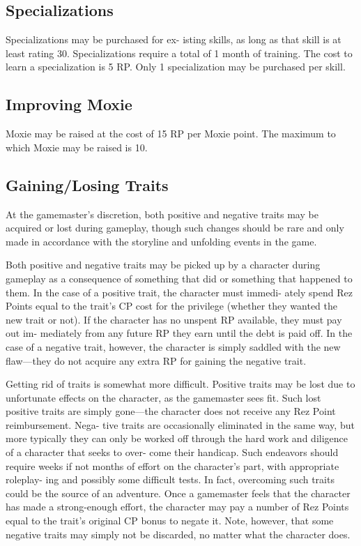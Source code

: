 \subsection{Specializations}

Specializations may be purchased for ex-
isting skills, as long as that skill is at least 
rating 30. Specializations require a total 
of 1 month of training. The cost to learn a 
specialization is 5 RP. Only 1 specialization 
may be purchased per skill.

\subsection{Improving Moxie}

Moxie may be raised at the cost of 15 RP per 
Moxie point. The maximum to which Moxie 
may be raised is 10.

\subsection{Gaining/Losing Traits}

At the gamemaster's discretion, both positive 
and negative traits may be acquired or lost 
during gameplay, though such changes should 
be rare and only made in accordance with the 
storyline and unfolding events in the game.

Both positive and negative traits may be 
picked up by a character during gameplay 
as a consequence of something that did or 
something that happened to them. In the case 
of a positive trait, the character must immedi-
ately spend Rez Points equal to the trait's CP 
cost for the privilege (whether they wanted 
the new trait or not). If the character has no 
unspent RP available, they must pay out im-
mediately from any future RP they earn until 
the debt is paid off. In the case of a negative 
trait, however, the character is simply saddled 
with the new flaw—they do not acquire any 
extra RP for gaining the negative trait.

Getting rid of traits is somewhat more 
difficult. Positive traits may be lost due to 
unfortunate effects on the character, as the 
gamemaster sees fit. Such lost positive traits 
are simply gone—the character does not 
receive any Rez Point reimbursement. Nega-
tive traits are occasionally eliminated in the 
same way, but more typically they can only 
be worked off through the hard work and 
diligence of a character that seeks to over-
come their handicap. Such endeavors should 
require weeks if not months of effort on the 
character's part, with appropriate roleplay-
ing and possibly some difficult tests. In fact, 
overcoming such traits could be the source 
of an adventure. Once a gamemaster feels 
that the character has made a strong-enough 
effort, the character may pay a number of 
Rez Points equal to the trait's original CP 
bonus to negate it. Note, however, that some 
negative traits may simply not be discarded, 
no matter what the character does.

